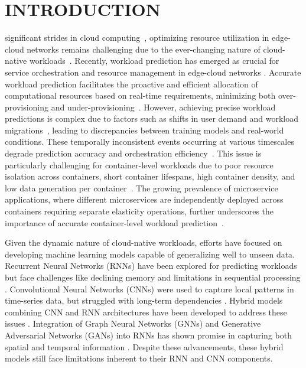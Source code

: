 \section{INTRODUCTION}
\label{Section: Introduction}

 significant strides in cloud computing~\cite{10229034}, optimizing resource utilization in edge-cloud networks remains challenging due to the ever-changing nature of cloud-native workloads~\cite{10646623}. Recently, workload prediction has emerged as crucial for service orchestration and resource management in edge-cloud networks \cite{10068185}. Accurate workload prediction facilitates the proactive and efficient allocation of computational resources based on real-time requirements, minimizing both over-provisioning and under-provisioning~\cite{10229064, 8258257, 9068614}. However, achieving precise workload predictions is complex due to factors such as shifts in user demand and workload migrations~\cite{ouyang2023dynamic}, leading to discrepancies between training models and real-world conditions. These temporally inconsistent events occurring at various timescales degrade prediction accuracy and orchestration efficiency~\cite{saxena2023performance}. This issue is particularly challenging for container-level workloads due to poor resource isolation across containers, short container lifespans, high container density, and low data generation per container~\cite{10417087, 10202641}. The growing prevalence of microservice applications, where different microservices are independently deployed across containers requiring separate elasticity operations, further underscores the importance of accurate container-level workload prediction~\cite{10202641, shang2023online, 10052731}.

Given the dynamic nature of cloud-native workloads, efforts have focused on developing machine learning models capable of generalizing well to unseen data. Recurrent Neural Networks (RNNs) have been explored for predicting workloads but face challenges like declining memory and limitations in sequential processing \cite{hochreiter1998vanishing, benidis2022deep}. Convolutional Neural Networks (CNNs) were used to capture local patterns in time-series data, but struggled with long-term dependencies \cite{acmtimeseriesreview2024}. Hybrid models combining CNN and RNN architectures have been developed to address these issues \cite{xu2022esdnn}. Integration of Graph Neural Networks (GNNs) and Generative Adversarial Networks (GANs) into RNNs has shown promise in capturing both spatial and temporal information \cite{li2024evogwp, RNNGAN, AGCRN}. Despite these advancements, these hybrid models still face limitations inherent to their RNN and CNN components.


